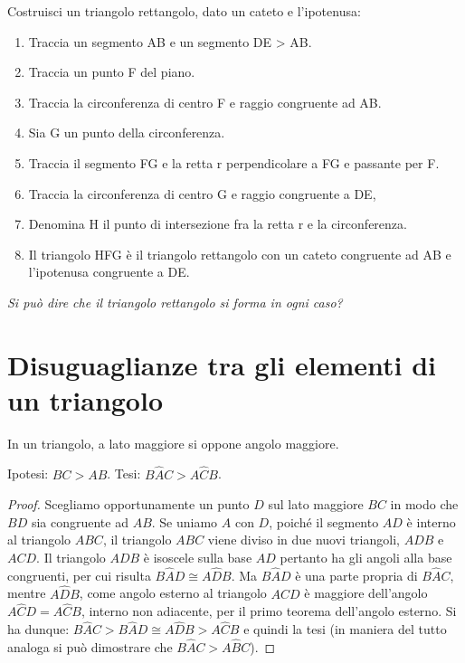 \begin{procedura}
  Costruisci un triangolo rettangolo, dato un cateto e l'ipotenusa:
  \begin{enumerate} [nosep]
    \item 
    Traccia un segmento AB e un segmento DE > AB.
    \item 
    Traccia un punto F del piano.
    \item 
    Traccia la circonferenza di centro F e raggio congruente ad AB.
    \item 
    Sia G un punto della circonferenza.
    \item 
    Traccia il segmento FG e la retta r perpendicolare a FG e passante per F.
    \item 
    Traccia la circonferenza di centro G e raggio congruente a DE,
    \item 
    Denomina H il punto di intersezione fra la retta r e la circonferenza.
    \item 
    Il triangolo HFG è il triangolo rettangolo con un cateto congruente ad AB e 
l'ipotenusa congruente a DE.
  \end{enumerate}
  \textsl{Si può dire che il triangolo rettangolo si forma in ogni caso?}
\end{procedura}

\section{Disuguaglianze tra gli elementi di un 
  triangolo}\label{sect:disuguaglianze_triangoli}

\begin{teorema}
  In un triangolo, a lato maggiore si oppone angolo maggiore.
\end{teorema}

\noindent\begin{minipage}{0.7\textwidth}
  \noindent Ipotesi: \(BC>AB\). Tesi: \(B\widehat{A}C>A\widehat{C}B\).
  
  \begin{proof}
    Scegliamo opportunamente un punto \(D\) sul lato maggiore \(BC\) in modo 
    che \(BD\) sia congruente ad \(AB\). Se uniamo \(A\) con \(D\), poiché il 
    segmento \(AD\) è interno al triangolo \(ABC\), il triangolo \(ABC\) viene 
    diviso in due nuovi triangoli, \(ADB\) e \(ACD\). Il triangolo \(ADB\) è 
    isoscele sulla base \(AD\) pertanto ha gli angoli alla base congruenti, 
    per cui risulta \(B\widehat{A}D\cong A\widehat{D}B\). Ma 
    \(B\widehat{A}D\) è una parte propria di \(B\widehat{A}C\), mentre 
    \(A\widehat{D}B\), come angolo esterno al triangolo \(ACD\) è maggiore 
    dell'angolo \(A\widehat{C}D=A\widehat{C}B\), interno non adiacente, per 
    il primo teorema dell'angolo esterno. Si ha dunque: 
    \(B\widehat{A}C>B\widehat{A}D\cong A\widehat{D}B>A\widehat{C}B\) e 
    quindi la tesi (in maniera del tutto analoga si può dimostrare che 
    \(B\widehat{A}C>A\widehat{B}C\)).
  \end{proof}
\end{minipage}\hfil
\begin{minipage}{0.3\textwidth}
  \centering
\end{minipage}

